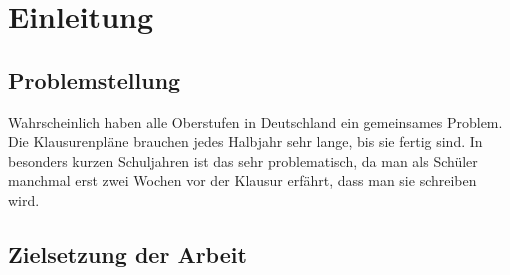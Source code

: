 \newpage
\section{Einleitung}
\subsection{Problemstellung}
Wahrscheinlich haben alle Oberstufen in Deutschland ein gemeinsames Problem. Die Klausurenpläne brauchen jedes Halbjahr sehr lange, bis sie fertig sind. In besonders kurzen Schuljahren ist das sehr problematisch, da man als Schüler manchmal erst zwei Wochen vor der Klausur erfährt, dass man sie schreiben wird. \subsection{Zielsetzung der Arbeit}